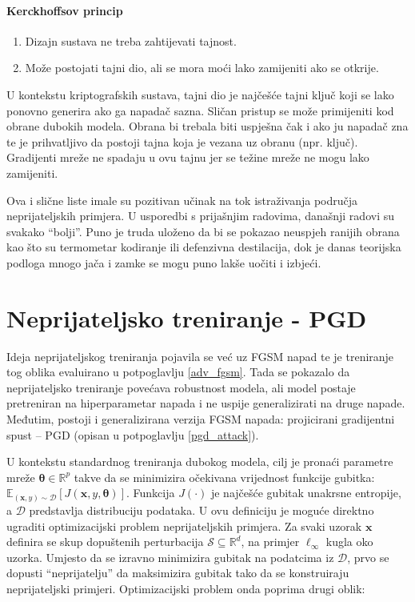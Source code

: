 \documentclass[utf8, diplomski]{fer}
\begin{document}
\paragraph{Kerckhoffsov princip}
\begin{enumerate}[noitemsep,topsep=0pt,parsep=0pt,partopsep=0pt]
	\item Dizajn sustava ne treba zahtijevati tajnost.
	\item Može postojati tajni dio, ali se mora moći lako zamijeniti ako se otkrije.
\end{enumerate}
U kontekstu kriptografskih sustava, tajni dio je najčešće tajni ključ koji se lako ponovno generira ako ga napadač sazna. Sličan pristup se može primijeniti kod obrane dubokih modela. Obrana bi trebala biti uspješna čak i ako ju napadač zna te je prihvatljivo da postoji tajna koja je vezana uz obranu (npr. ključ). Gradijenti mreže ne spadaju u ovu tajnu jer se težine mreže ne mogu lako zamijeniti. 
\par
Ova i slične liste imale su pozitivan učinak na tok istraživanja područja neprijateljskih primjera. U usporedbi s prijašnjim radovima, današnji radovi su svakako ``bolji''. Puno je truda uloženo da bi se pokazao neuspjeh ranijih obrana kao što su termometar kodiranje ili defenzivna destilacija, dok je danas teorijska podloga mnogo jača i zamke se mogu puno lakše uočiti i izbjeći.

\section{Neprijateljsko treniranje - PGD}\label{pgd_adv}
Ideja neprijateljskog treniranja pojavila se već uz FGSM napad\citep{Goodfellow2015ExplainingAH} te je treniranje tog oblika evaluirano u potpoglavlju \ref{adv_fgsm}. Tada se pokazalo da neprijateljsko treniranje povećava robustnost modela, ali model postaje pretreniran na hiperparametar napada i ne uspije generalizirati na druge napade. Međutim, postoji i generalizirana verzija FGSM napada: projicirani gradijentni spust -- PGD (opisan u potpoglavlju \ref{pgd_attack}). \par 
U kontekstu standardnog treniranja dubokog modela, cilj je pronaći parametre mreže $\boldsymbol{\theta} \in \mathbb{R}^{p}$ takve da se minimizira očekivana vrijednost funkcije gubitka: $\mathbb{E}_{(\boldsymbol{x}, y) \sim \mathcal{D}} [J(\boldsymbol{x}, y, \boldsymbol{\theta})]$. Funkcija $J(\cdot)$ je najčešće gubitak unakrsne entropije, a $\mathcal{D}$ predstavlja distribuciju podataka. U ovu definiciju je moguće direktno ugraditi optimizacijski problem neprijateljskih primjera. Za svaki uzorak $\boldsymbol{x}$ definira se skup dopuštenih perturbacija $\mathcal{S} \subseteq \mathbb{R}^{d}$, na primjer $\ell_{\infty}$ kugla oko uzorka. Umjesto da se izravno minimizira gubitak na podatcima iz $\mathcal{D}$, prvo se dopusti ``neprijatelju'' da maksimizira gubitak tako da se konstruiraju neprijateljski primjeri. Optimizacijski problem onda poprima drugi oblik:
\end{document}
